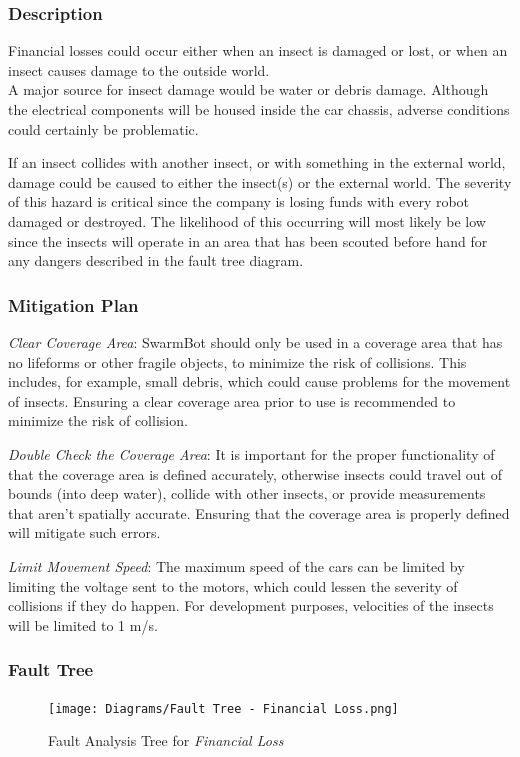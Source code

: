 \documentclass[11pt]{article}
\begin{document}
\subsubsection*{Description}
Financial losses could occur either when an insect is damaged or lost, or when an insect causes
damage to the outside world. \\

A major source for insect damage would be water or debris damage. Although the electrical components will be
housed inside the car chassis, adverse conditions could certainly be problematic.

If an insect collides with another insect, or with something in the external world, damage could be
caused to either the insect(s) or the external world. The severity of this hazard is critical since the company is losing funds with every robot damaged or destroyed. The likelihood of this occurring will most likely be low since the insects will operate in an area that has been scouted before hand for any dangers described in the fault tree diagram. 
\subsubsection*{Mitigation Plan}
\textit{Clear Coverage Area}: SwarmBot should only be used in a coverage area that has no
lifeforms or other fragile objects, to minimize the risk of collisions. This includes, for example,
small debris, which could cause problems for the movement of insects.
Ensuring a clear coverage area prior to use is recommended to minimize the risk of collision. 

\textit{Double Check the Coverage Area}: It is important for the proper functionality of \PROJECTNAME
that the coverage area is defined accurately, otherwise insects could travel out of bounds (into deep water),
collide with other insects, or provide measurements that aren't spatially accurate. Ensuring
that the coverage area is properly defined will mitigate such errors.

\textit{Limit Movement Speed}: The maximum speed of the cars can be limited by limiting the voltage
sent to the motors, which could lessen the severity of collisions if they do happen. For development
purposes, velocities of the insects will be limited to 1 m/s.

\subsubsection*{Fault Tree}
\begin{figure}[H]
   \centering
   \texttt{[image: Diagrams/Fault Tree - Financial Loss.png]} %
   \caption{Fault Analysis Tree for \textit{Financial Loss}}
   \label{fig:ft-Air}
\end{figure}
\end{document}
